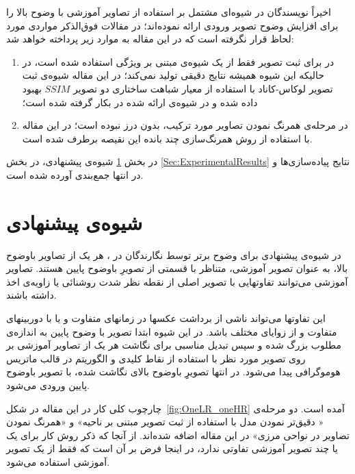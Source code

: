 \documentclass[11pt,a4paper,twocolumn]{article}
\makeatletter
\numberwithin{table}{section}
\let\orig@lr\lr
\renewcommand*{\lr}[1]{\texorpdfstring{\orig@lr{#1}}{#1}}
\makeatother
\begin{document}
اخیراً نویسندگان در \cite{Amintoosi08reconstruction,Amintoosi09regional} شیوه‌ای مشتمل بر استفاده از تصاویر آموزشی با وضوح بالا را برای افزایش وضوح تصویر ورودی ارائه نموده‌اند؛ در مقالات فوق‌الذکر مواردی مورد لحاظ قرار نگرفته است که در این مقاله به موارد زیر پرداخته خواهد شد:
\begin{enumerate}
\item
در \cite{Amintoosi08reconstruction} برای ثبت تصویر فقط از یک شیوه‌ی مبتنی بر ویژگی استفاده شده است، در حالیکه این شیوه همیشه نتایج دقیقی تولید نمی‌کند؛ در این مقاله شیوه‌ی ثبت تصویر لوکاس-کاناد با استفاده از معیار شباهت ساختاری دو تصویر $SSIM$\cite{Wang04image} بهبود داده شده و در شیوه‌ی ارائه شده در \cite{Amintoosi08reconstruction} بکار گرفته شده است؛
\item
در \cite{Amintoosi08reconstruction,Amintoosi09regional} مرحله‌ی همرنگ نمودن تصاویر مورد ترکیب، بدون درز نبوده است؛ در این مقاله با استفاده از روش  همرنگ‌سازی چند بانده این نقیصه برطرف شده است.
\end{enumerate}

 در بخش \ref{Sec:TheProposedMethod} شیوه‌ی پیشنهادی، در بخش \ref{Sec:ExperimentalResults} نتایج پیاده‌سازی‌ها و در انتها جمع‌بندی آورده شده است.




\section{شیوه‌ی پیشنهادی}\label{Sec:TheProposedMethod}

در شیوه‌ی پیشنهادی برای وضوح برتر توسط نگارندگان در \cite{Amintoosi08reconstruction}، هر یک از تصاویر باوضوح بالا، به عنوان تصویر آموزشی، متناظر با قسمتی از تصویرِ باوضوح پایین هستند.  تصاویر آموزشی می‌توانند تفاوتهایی با تصویر اصلی از نقطه نظر شدت روشنائی یا زاویه‌ی اخذ داشته باشند. 

 این تفاوتها می‌تواند ناشی از برداشت عکسها در زمانهای متفاوت و یا با دوربینهای متفاوت و از زوایای مختلف باشد. در این شیوه ابتدا تصویر با وضوح پایین به اندازه‌ی مطلوب بزرگ شده و سپس  تبدیل مناسبی برای نگاشت هر یک از تصاویر آموزشی بر روی تصویر مورد نظر با استفاده از  نقاط کلیدی  و الگوریتم  در قالب ماتریس هوموگرافی پیدا می‌شود. در انتها تصویرِِ باوضوح بالای نگاشت شده، با تصویر باوضوح پایین ورودی  می‌شود.

چارچوب کلی کار در این مقاله در شکل~\ref{fig:OneLR_oneHR} آمده است. دو مرحله‌ی « دقیق‌تر نمودن مدل با استفاده از ثبت تصویر مبتنی بر ناحیه» و «همرنگ نمودن تصاویر در نواحی مرزی» در این مقاله اضافه شده‌اند. از آنجا که ذکر روش کار برای یک یا چند تصویر آموزشی تفاوتی ندارد، در اینجا فرض بر آن است که فقط از یک تصویر آموزشی استفاده می‌شود.
\end{document}
